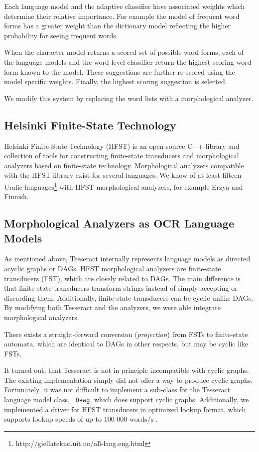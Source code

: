 \documentclass[b5paper]{article}
\begin{document}
Each language model and the adaptive classifier have associated
weights which determine their relative importance. For example the
model of frequent word forms has a greater weight than the dictionary
model reflecting the higher probability for seeing frequent words.

When the character model returns a scored set of possible word forms,
each of the language models and the word level classifier return the
highest scoring word form known to the model. These suggestions are
further re-scored using the model specific weights. Finally, the highest
scoring suggestion is selected.

We modify this system by replacing the word lists with a
morphological analyzer.

\subsection{Helsinki Finite-State Technology}
Helsinki Finite-State Technology (HFST) \cite{linden13} is an
open-source C++ library and collection of tools for constructing
finite-state transducers and morphological analyzers based on
finite-state technology. Morphological analyzers compatible with the
HFST library exist for several languages. We know of at least fifteen
Uralic languages\footnote{http://giellatekno.uit.no/all-lang.eng.html}
with HFST morphological analyzers, for example Erzya and Finnish.

\subsection{Morphological Analyzers as OCR Language Models}
As mentioned above, Tesseract internally represents language models as
directed acyclic graphs or DAGs. HFST morphological analyzers are
finite-state transducers (FST), which are closely related to DAGs. The
main difference is that finite-state transducers transform strings
instead of simply accepting or discarding them. Additionally,
finite-state transducers can be cyclic unlike DAGs. By modifying both
Tesseract and the analyzers, we were able integrate morphological
analyzers.

There exists a straight-forward conversion ({\it projection})
from FSTs to finite-state automata, which are identical to DAGs in
other respects, but may be cyclic like FSTs. 

It turned out, that Tesseract is not in principle incompatible with
cyclic graphs. The existing implementation simply did not offer a way
to produce cyclic graphs. Fortunately, it was not difficult to
implement a sub-class for the Tesseract language model class, {\tt
  Dawg}, which does support cyclic graphs. Additionally, we implemented a
driver for HFST transducers in optimized lookup format, which supports
lookup speeds of up to 100 000 words/s \cite{silfverberg09}.
\end{document}
